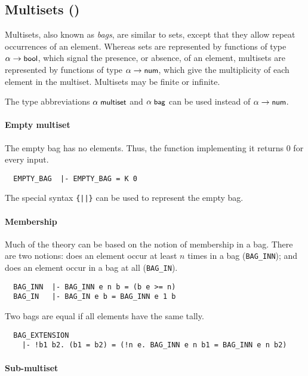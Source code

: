 \subsection{Multisets ()}\label{multiset}

Multisets, also known as \emph{bags}, are similar to sets, except that
they allow repeat occurrences of an element. Whereas sets are
represented by functions of type $\alpha\to\mbox{\small{\textbf{\sf{bool}}}}$, which signal
the presence, or absence, of an element, multisets are represented
by functions of type $\alpha\to\mbox{\small{\textbf{\sf{num}}}}$, which give the
multiplicity of each element in the multiset. Multisets may be finite
or infinite.

The type abbreviations $\alpha\;\mbox{\small{\textbf{\sf{multiset}}}}$ and
$\alpha\;\mbox{\small{\textbf{\sf{bag}}}}$ can be used instead of $\alpha\to\mbox{\small{\textbf{\sf{num}}}}$.

\paragraph {Empty multiset}

The empty bag has no elements. Thus, the function implementing it
returns $0$ for every input.
%
{\small
\begin{verbatim}
  EMPTY_BAG  |- EMPTY_BAG = K 0
\end{verbatim}}

\noindent The special syntax {\verb+{||}+} can be used to represent the empty
bag.

\paragraph {Membership}

Much of the theory can be based on the notion of membership in a
bag. There are two notions: does an element occur at least $n$ times
in a bag ({\small\verb+BAG_INN+}); and does an element occur in a bag
at all ({\small\verb+BAG_IN+}).
%
{\small
\begin{verbatim}
  BAG_INN  |- BAG_INN e n b = (b e >= n)
  BAG_IN   |- BAG_IN e b = BAG_INN e 1 b
\end{verbatim}}
%
\noindent Two bags are equal if all elements have the same tally.
%
{\small
\begin{verbatim}
  BAG_EXTENSION
    |- !b1 b2. (b1 = b2) = (!n e. BAG_INN e n b1 = BAG_INN e n b2)
\end{verbatim}}

\paragraph{Sub-multiset}

